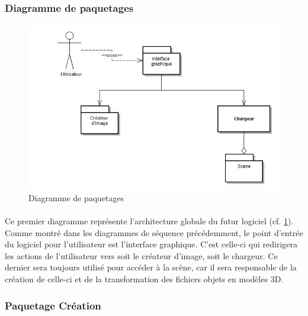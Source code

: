 \subsubsection{Diagramme de paquetages}

\begin{figure}[h]
		\centering
		\includegraphics[scale=0.4]{diag_packages.jpg}
		\caption{\label{fig:diagPaquetage} Diagramme de paquetages}
\end{figure}

\paragraph{}
Ce premier diagramme représente l’architecture globale du futur logiciel (cf. \ref{fig:diagPaquetage}). Comme montré dans les diagrammes de séquence précédemment, le point d’entrée du logiciel pour l’utilisateur est l’interface graphique. C’est celle-ci qui redirigera les actions de l’utilisateur vers soit le créateur d’image, soit le chargeur. Ce dernier sera toujours utilisé pour accéder à la scène, car il sera responsable de la création de celle-ci et de la transformation des fichiers objets en modèles 3D.

\subsubsection{Paquetage Création}

